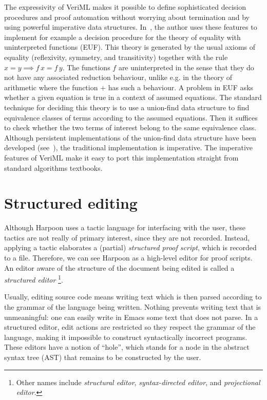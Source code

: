 The expressivity of VeriML makes it possible to define sophisticated decision
procedures and proof automation without worrying about termination and by using
powerful imperative data structures.
In~\cite{Stampoulis:ICFP10}, the author uses these features to implement for
example a decision procedure for the theory of equality with uninterpreted
functions (EUF).
This theory is generated by the usual axioms of equality
(reflexivity, symmetry, and transitivity) together with the rule
$x = y \implies f\, x = f\, y$.
The functions $f$ are uninterpreted in the sense that they do not have any
associated reduction behaviour, unlike e.g. in the theory of arithmetic where
the function $+$ has such a behaviour.
A problem in EUF asks whether a given equation is true in a context of assumed
equations.
The standard technique for deciding this theory is to use a union-find data
structure to find equivalence classes of terms according to the assumed
equations.
Then it suffices to check whether the two terms of interest belong to the same
equivalence class.
Although persistent implementations of the union-find data structure have been
developed (see~\cite{union-find}), the traditional implementation is
imperative.
The imperative features of VeriML make it easy to port this implementation
straight from standard algorithms textbooks.

\section{Structured editing}
\label{sec:structured-editing}

Although Harpoon uses a tactic language for interfacing with the user, these
tactics are not really of primary interest, since they are not
recorded.
Instead, applying a tactic elaborates a (partial)
\emph{structured proof script}, which is recorded to a file.
Therefore, we can see Harpoon as a high-level editor for proof scripts.
An editor aware of the structure of the document being edited is called a
\emph{structured editor}%
\footnote{%
  Other names include \emph{structural editor}, \emph{syntax-directed editor},
  and \emph{projectional editor}.%
}.

Usually, editing source code means writing text which is then parsed according
to the grammar of the language being written.
Nothing prevents writing text that is unmeaningful: one can easily write in
Emacs some text that does not parse.
In a structured editor, edit actions are restricted so they respect the grammar
of the language, making it impossible to construct syntactically incorrect
programs.
These editors have a notion of ``hole'', which stands for a node in the abstract
syntax tree (AST) that remains to be constructed by the user.

